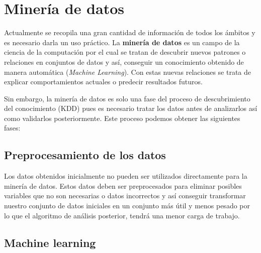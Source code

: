 
\begin{comment}
En aquellos proyectos que necesiten para su comprensión y desarrollo de unos conceptos teóricos de una determinada materia o de un determinado dominio de conocimiento, debe existir un apartado que sintetice dichos conceptos.
\end{comment}



\section{Minería de datos}
Actualmente se recopila una gran cantidad de información de todos los ámbitos y es necesario darla un uso práctico. La \textbf{minería de datos} es un campo de la ciencia de la computación por el cual se tratan de descubrir nuevos patrones o relaciones en conjuntos de datos y así, conseguir un conocimiento obtenido de manera automática (\emph{Machine Learning}). Con estas nuevas relaciones se trata de explicar comportamientos actuales o predecir resultados futuros. \cite{mineria_tecnicas_herramientas}

Sin embargo, la minería de datos es solo una fase del proceso de descubrimiento del conocimiento (KDD) pues es necesario tratar los datos antes de analizarlos así como validarlos posteriormente. Este proceso podemos obtener las siguientes fases:


\subsection{Preprocesamiento de los datos}
Los datos obtenidos inicialmente no pueden ser utilizados directamente para la minería de datos. Estos datos deben ser preprocesados para eliminar posibles variables que no son necesarias o datos incorrectos y así conseguir transformar nuestro conjunto de datos iniciales en un conjunto más útil y menos pesado por lo que el algoritmo de análisis posterior, tendrá una menor carga de trabajo. 

\subsection{Machine learning}






